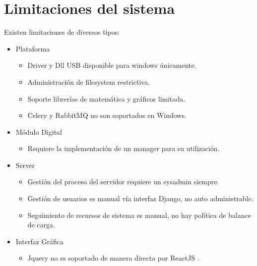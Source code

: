 \section{Limitaciones del sistema}

Existen limitaciones de diversos tipos:

\begin{itemize}
    \item Plataforma
    \begin{itemize}
    \item Driver y Dll USB disponible para windows \'unicamente.
    \item Administraci\'on de filesystem restrictiva. 
    \item Soporte librer\'ias de matem\'atica y gr\'aficos limitada.
    \item Celery y RabbitMQ no son soportados en Windows.\cite{celery} 
    \end{itemize}
    \item M\'odulo Digital
    \begin{itemize}
        \item Requiere la implementaci\'on de un manager para su utilizaci\'on.
    \end{itemize}
    \item Server
    \begin{itemize}
        \item Gesti\'on del proceso del servidor requiere un sysadmin siempre.
        \item Gesti\'on de usuarios es manual v\'ia interfaz Django, no auto administrable.
        \item Seguimiento de recursos de sistema es manual, no hay pol\'itica de balance de carga.
    \end{itemize}
    \item Interfaz Gr\'afica
    \begin{itemize} 
        \item Jquery no es soportado de manera directa por ReactJS\cite{react_jquery} .
    \end{itemize}
\end{itemize}
\newpage
